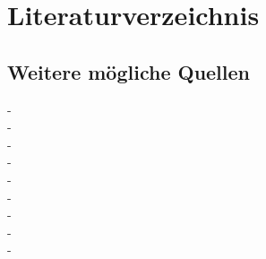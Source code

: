 \documentclass[12pt,a4paper]{article}        %
\begin{document}
\section{Literaturverzeichnis}
\printbibliography
\subsection{Weitere mögliche Quellen}

- \cite{antos_web_2019} \\
- \cite{brill_death_2024} \\
- \cite{fernandes_post-factual_2022} \\
- \cite{latzer_vertrauen_2023} \\
- \cite{reuter_fake_2019} \\
- \cite{wahl_fake_2021} \\
- \cite{dander_fake_2020} \\
- \cite{waller_jamesfocus_2019} \\
- \cite{zoglauer_konstruierte_2021} \\
\end{document}
